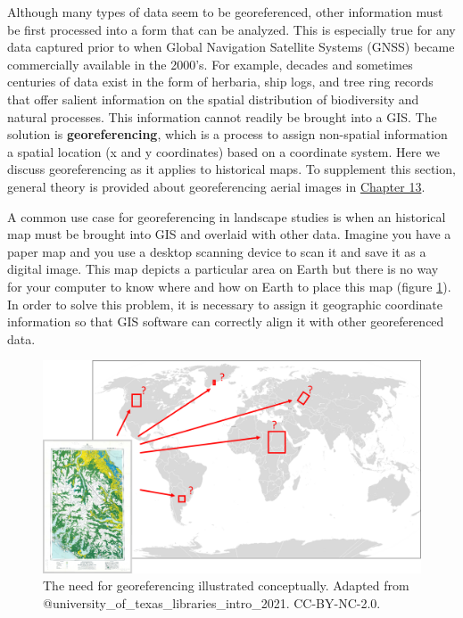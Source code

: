 \documentclass[
]{book}
\begin{document}
Although many types of data seem to be georeferenced, other information must be first processed into a form that can be analyzed. This is especially true for any data captured prior to when Global Navigation Satellite Systems (GNSS) became commercially available in the 2000's. For example, decades and sometimes centuries of data exist in the form of herbaria, ship logs, and tree ring records that offer salient information on the spatial distribution of biodiversity and natural processes. This information cannot readily be brought into a GIS. The solution is \textbf{georeferencing}, which is a process to assign non-spatial information a spatial location (x and y coordinates) based on a coordinate system. Here we discuss georeferencing as it applies to historical maps. To supplement this section, general theory is provided about georeferencing aerial images in \href{https://ubc-geomatics-textbook.github.io/geomatics-textbook/image-processing.html}{Chapter 13}.

A common use case for georeferencing in landscape studies is when an historical map must be brought into GIS and overlaid with other data. Imagine you have a paper map and you use a desktop scanning device to scan it and save it as a digital image. This map depicts a particular area on Earth but there is no way for your computer to know where and how on Earth to place this map (figure \ref{fig:4-georeferencing-concept}). In order to solve this problem, it is necessary to assign it geographic coordinate information so that GIS software can correctly align it with other georeferenced data.



\begin{figure}
\includegraphics[width=0.75\linewidth]{images/04-georeferencing-concept} \caption{The need for georeferencing illustrated conceptually. Adapted from @university_of_texas_libraries_intro_2021. CC-BY-NC-2.0.}\label{fig:4-georeferencing-concept}
\end{figure}
\end{document}
